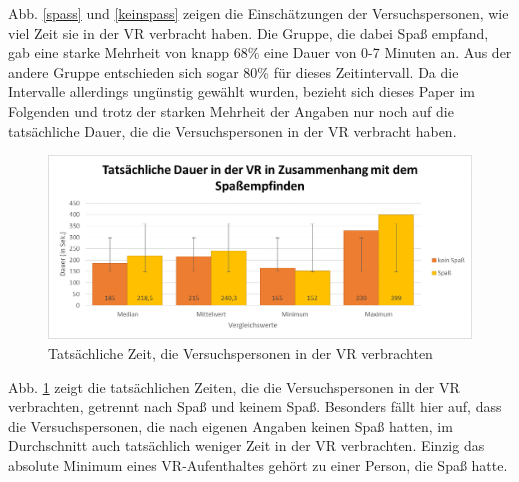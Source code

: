 \documentclass{Paper}
\begin{document}
Abb. \ref{spass} und \ref{keinspass} zeigen die Einschätzungen der Versuchspersonen, wie viel Zeit sie in der VR verbracht haben. Die Gruppe, die dabei Spaß empfand, gab eine starke Mehrheit von knapp 68\% eine Dauer von 0-7 Minuten an. Aus der andere Gruppe entschieden sich sogar 80\% für dieses Zeitintervall. Da die Intervalle allerdings ungünstig gewählt wurden, bezieht sich dieses Paper im Folgenden und trotz der starken Mehrheit der Angaben nur noch auf die tatsächliche Dauer, die die Versuchspersonen in der VR verbracht haben.


      
     \begin{figure}[H]
	\includegraphics[scale=0.7]{../Diagramme/spass/spassDauer.png}
  \caption{Tatsächliche Zeit, die Versuchspersonen in der VR verbrachten}
  \label{ZeitKeinSpass}
        \end{figure}
        
        Abb. \ref{ZeitKeinSpass} zeigt die tatsächlichen Zeiten, die die Versuchspersonen in der VR verbrachten, getrennt nach Spaß und keinem Spaß. Besonders fällt hier auf, dass die Versuchspersonen, die nach eigenen Angaben keinen Spaß hatten, im Durchschnitt auch tatsächlich weniger Zeit in der VR verbrachten. Einzig das absolute Minimum eines VR-Aufenthaltes gehört zu einer Person, die Spaß hatte. 
\end{document}
